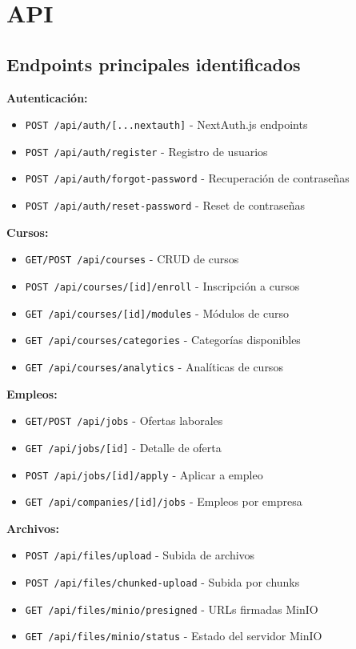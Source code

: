 \documentclass[12pt,a4paper]{article}
\begin{document}
\section{API}

\subsection{Endpoints principales identificados}

\textbf{Autenticación:}
\begin{itemize}
    \item \texttt{POST /api/auth/[...nextauth]} - NextAuth.js endpoints
    \item \texttt{POST /api/auth/register} - Registro de usuarios
    \item \texttt{POST /api/auth/forgot-password} - Recuperación de contraseñas
    \item \texttt{POST /api/auth/reset-password} - Reset de contraseñas
\end{itemize}

\textbf{Cursos:}
\begin{itemize}
    \item \texttt{GET/POST /api/courses} - CRUD de cursos
    \item \texttt{POST /api/courses/[id]/enroll} - Inscripción a cursos
    \item \texttt{GET /api/courses/[id]/modules} - Módulos de curso
    \item \texttt{GET /api/courses/categories} - Categorías disponibles
    \item \texttt{GET /api/courses/analytics} - Analíticas de cursos
\end{itemize}

\textbf{Empleos:}
\begin{itemize}
    \item \texttt{GET/POST /api/jobs} - Ofertas laborales
    \item \texttt{GET /api/jobs/[id]} - Detalle de oferta
    \item \texttt{POST /api/jobs/[id]/apply} - Aplicar a empleo
    \item \texttt{GET /api/companies/[id]/jobs} - Empleos por empresa
\end{itemize}

\textbf{Archivos:}
\begin{itemize}
    \item \texttt{POST /api/files/upload} - Subida de archivos
    \item \texttt{POST /api/files/chunked-upload} - Subida por chunks
    \item \texttt{GET /api/files/minio/presigned} - URLs firmadas MinIO
    \item \texttt{GET /api/files/minio/status} - Estado del servidor MinIO
\end{itemize}
\end{document}

